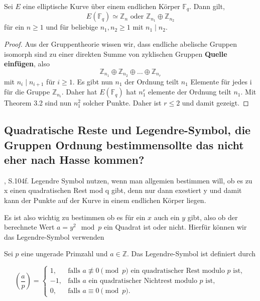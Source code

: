     \begin{theorem}
    Sei $E$ eine elliptische Kurve über einem endlichen Körper $\mathbb{F}_q$. Dann gilt, 
    \[
    E(\mathbb{F}_q) \simeq \mathbb{Z}_n \text {  oder  } \mathbb{Z}_{n_1} \oplus \mathbb{Z}_{n_2}
    \]
    für ein $n \geq 1$ und für beliebige $n_1,n_2\geq1$ mit $n_1\mid n_2$.
    \end{theorem}
    \begin{proof}
    Aus der Gruppentheorie wissen wir, dass endliche abelische Gruppen isomorph sind zu einer direkten Summe von zyklischen Gruppen \textbf{Quelle einfügen}, also
    \[\mathbb{Z}_{n_1}\oplus \mathbb{Z}_{n_2}\oplus \dots\oplus\mathbb{Z}_{n_r}\]
    mit $n_i\mid n_{i+1}$ für $i\geq 1$. Es gibt nun $n_1$ der Ordnung teilt $n_1$ Elemente für jedes i für die Gruppe $\mathbb{Z}_{n_i}$. Daher hat $E(\mathbb{F}_q)$ hat $n^r_1$ elemente der Ordnung teilt $n_1.$ Mit Theorem 3.2 sind nun $n^2_1$ solcher Punkte. Daher ist $r\leq 2$ und damit gezeigt.
    
    \end{proof}
    

    
\subsection{Quadratische Reste und Legendre-Symbol, die Gruppen Ordnung bestimmensollte das nicht eher nach Hasse kommen?}

\cite{washington08}, S.104f.
Legendre Symbol nutzen, wenn man allgemien bestimmen will, ob es zu x einen quadratischen Rest mod q gibt, denn nur dann exestiert y und damit kann der Punkte auf der Kurve in einem endlichen Körper liegen.


    Es ist also wichtig zu bestimmen ob es für ein $x$ auch ein $y$ gibt, also ob der berechnete Wert $a=y^2 \mod p$ ein Quadrat ist oder nicht. Hierfür können wir das Legendre-Symbol verwenden
         
    \begin{definition}
    Sei \(p\) eine ungerade Primzahl und \(a\in\mathbb Z\). Das Legendre-Symbol ist definiert durch
    
    \[
    \left(\frac{a}{p}\right)
    =
    \begin{cases}
    1, & \text{falls } a \not\equiv 0 \pmod p \text{ ein quadratischer Rest modulo } p \text{ ist},\\
    -1, & \text{falls } a \text{ ein quadratischer Nichtrest modulo } p \text{ ist},\\
    0, & \text{falls } a \equiv 0 \pmod p.
    \end{cases}
    \]
    \end{definition}

